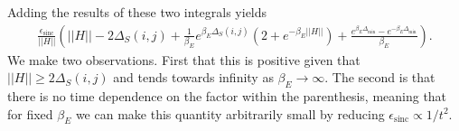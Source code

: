 \documentclass{article}
\newcommand{\parens}[1]{\left( #1 \right)}
\newcommand{\norm}[1]{\left| \left| #1 \right| \right|}
\DeclareMathOperator{\sinc}{sinc}
\begin{document}
Adding the results of these two integrals yields
\begin{align}
    \frac{\epsilon_{\sinc}}{\norm{H}}\parens{\norm{H} - 2 \Delta_S(i,j) +  \frac{1}{\beta_E} e^{\beta_E \Delta_S(i,j)}(2 + e^{-\beta_E \norm{H}}) + \frac{e^{\beta_E \Delta_{\min}} - e^{-\beta_E \Delta_{\min}}}{\beta_E}}.
\end{align}
We make two observations. First that this is positive given that $\norm{H} \geq 2 \Delta_S(i,j)$ and tends towards infinity as $\beta_E \to \infty$. The second is that there is no time dependence on the factor within the parenthesis, meaning that for fixed $\beta_E$ we can make this quantity arbitrarily small by reducing $\epsilon_{\sinc} \propto 1/t^2$. 
\end{document}
